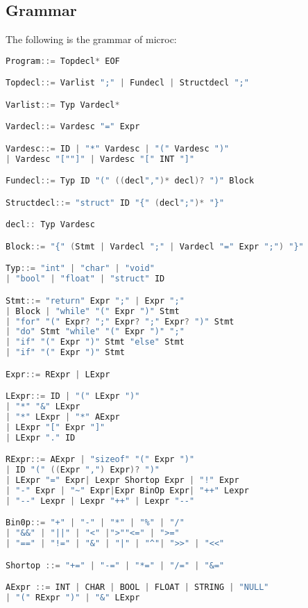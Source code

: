 \documentclass{article}
\begin{document}
\subsection{Grammar}
The following is the grammar of microc:
\begin{lstlisting}[language=C, basicstyle=\ttfamily\fontsize{8pt}{14pt}, keywordstyle=\color{blue}, commentstyle=\color{green}]
Program::= Topdecl* EOF

Topdecl::= Varlist ";" | Fundecl | Structdecl ";"

Varlist::= Typ Vardecl*

Vardecl::= Vardesc "=" Expr

Vardesc::= ID | "*" Vardesc | "(" Vardesc ")"
| Vardesc "[""]" | Vardesc "[" INT "]"

Fundecl::= Typ ID "(" ((decl",")* decl)? ")" Block

Structdecl::= "struct" ID "{" (decl";")* "}"

decl:: Typ Vardesc

Block::= "{" (Stmt | Vardecl ";" | Vardecl "=" Expr ";") "}"

Typ::= "int" | "char" | "void"
| "bool" | "float" | "struct" ID

Stmt::= "return" Expr ";" | Expr ";"
| Block | "while" "(" Expr ")" Stmt
| "for" "(" Expr? ";" Expr? ";" Expr? ")" Stmt
| "do" Stmt "while" "(" Expr ")" ";"
| "if" "(" Expr ")" Stmt "else" Stmt
| "if" "(" Expr ")" Stmt

Expr::= RExpr | LExpr

LExpr::= ID | "(" LExpr ")"
| "*" "&" LExpr
| "*" LExpr | "*" AExpr
| LExpr "[" Expr "]"
| LExpr "." ID

RExpr::= AExpr | "sizeof" "(" Expr ")"
| ID "(" ((Expr ",") Expr)? ")"
| LExpr "=" Expr| Lexpr Shortop Expr | "!" Expr
| "-" Expr | "~" Expr|Expr BinOp Expr| "++" Lexpr
| "--" Lexpr | Lexpr "++" | Lexpr "--"

Bin0p::= "+" | "-" | "*" | "%" | "/"
| "&&" | "||" | "<" |">""<=" | ">="
| "==" | "!=" | "&" | "|" | "^"| ">>" | "<<"

Shortop ::= "+=" | "-=" | "*=" | "/=" | "&="

AExpr ::= INT | CHAR | BOOL | FLOAT | STRING | "NULL"
| "(" RExpr ")" | "&" LExpr
\end{lstlisting}
\end{document}
